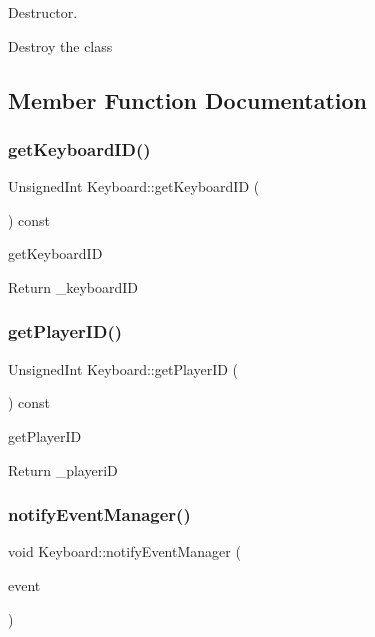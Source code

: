Destructor. 

Destroy the class 

\subsection{Member Function Documentation}
\mbox{\label{classKeyboard_a8bc4a7d865e268c0d126aa3f0a913bbb}} 
\subsubsection{\texorpdfstring{get\+Keyboard\+I\+D()}{getKeyboardID()}}
{\footnotesize\ttfamily Unsigned\+Int Keyboard\+::get\+Keyboard\+ID (\begin{DoxyParamCaption}\item[{void}]{ }\end{DoxyParamCaption}) const}



get\+Keyboard\+ID 

Return \+\_\+keyboard\+ID \mbox{\label{classKeyboard_ac8fe530866f42dd3a62ea66054bc148b}} 
\subsubsection{\texorpdfstring{get\+Player\+I\+D()}{getPlayerID()}}
{\footnotesize\ttfamily Unsigned\+Int Keyboard\+::get\+Player\+ID (\begin{DoxyParamCaption}\item[{void}]{ }\end{DoxyParamCaption}) const}



get\+Player\+ID 

Return \+\_\+playeriD \mbox{\label{classKeyboard_a6c6492921a44b4a4ab7e96566381353c}} 
\subsubsection{\texorpdfstring{notify\+Event\+Manager()}{notifyEventManager()}}
{\footnotesize\ttfamily void Keyboard\+::notify\+Event\+Manager (\begin{DoxyParamCaption}\item[{const irr\+::\+S\+Event \&}]{event }\end{DoxyParamCaption})}



